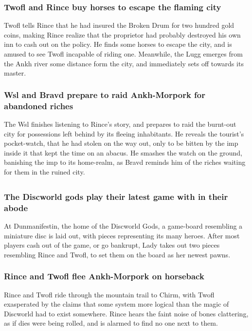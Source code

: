 \subsubsection{\Gls{Twofl} and \Gls{Rince} buy horses to escape the flaming city}
\Gls{Twofl} tells \Gls{Rince} that he had insured the Broken Drum for two hundred gold coins, making
\Gls{Rince} realize that the proprietor had probably destroyed his own inn to cash out on the
policy. He finds some horses to escape the city, and is amused to see \Gls{Twofl} incapable of
riding one. Meanwhile, the \Gls{Lugg} emerges from the Ankh river some distance form the city, and
immediately sets off towards its master.

\subsubsection{\Gls{Wsl} and \Gls{Bravd} prepare to raid Ankh-Morpork for abandoned riches}
The \Gls{Wsl} finishes listening to \Gls{Rince}'s story, and prepares to raid the burnt-out city
for possessions left behind by its fleeing inhabitants. He reveals the tourist's pocket-watch, that
he had stolen on the way out, only to be bitten by the imp inside it that kept the time on an
abacus. He smashes the watch on the ground, banishing the imp to its home-realm, as \Gls{Bravd}
reminds him of the riches waiting for them in the ruined city.

\subsection{}
\subsubsection{The Discworld gods play their latest game with in their abode}
At Dunmanifestin, the home of the Discworld Gods, a game-board resembling a miniature disc is laid
out, with pieces representing its many heroes. After most players cash out of the game, or go
bankrupt, \Gls{Lady} takes out two pieces resembling \Gls{Rince} and \Gls{Twofl}, to set them on
the board as her newest pawns.

\subsubsection{\Gls{Rince} and \Gls{Twofl} flee Ankh-Morpork on horseback}
\Gls{Rince} and \Gls{Twofl} ride through the mountain trail to Chirm, with \Gls{Twofl} exasperated
by the claims that some system more logical than the magic of Discworld had to exist somewhere.
\Gls{Rince} hears the faint noise of bones clattering, as if dies were being rolled, and is alarmed
to find no one next to them.


